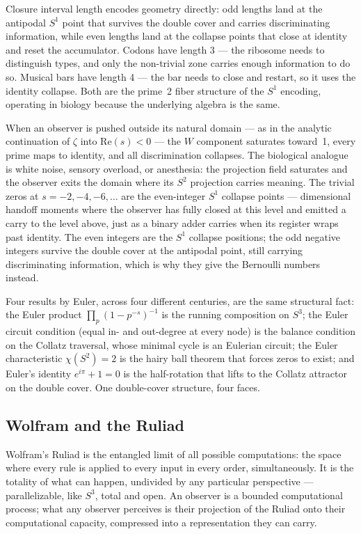 \documentclass[12pt,a4paper]{article}
\theoremstyle{definition}
\theoremstyle{remark}
\begin{document}
Closure interval length encodes geometry directly: odd lengths land at the
antipodal $S^1$ point that survives the double cover and carries discriminating
information, while even lengths land at the collapse points that close at
identity and reset the accumulator. Codons have length 3 --- the ribosome
needs to distinguish types, and only the non-trivial zone carries enough
information to do so. Musical bars have length 4 --- the bar needs to close
and restart, so it uses the identity collapse. Both are the prime~2 fiber
structure of the $S^1$ encoding, operating in biology because the underlying
algebra is the same.

When an observer is pushed outside its natural domain --- as in the analytic
continuation of $\zeta$ into $\mathrm{Re}(s) < 0$ --- the $W$ component
saturates toward~1, every prime maps to identity, and all discrimination
collapses. The biological analogue is white noise, sensory overload, or
anesthesia: the projection field saturates and the observer exits the domain
where its $S^2$ projection carries meaning. The trivial zeros at $s = -2, -4, -6, \ldots$ are the even-integer $S^1$
collapse points --- dimensional handoff moments where the observer has fully
closed at this level and emitted a carry to the level above, just as a binary
adder carries when its register wraps past identity. The even integers are the
$S^1$ collapse positions; the odd negative integers survive the double cover
at the antipodal point, still carrying discriminating information, which is
why they give the Bernoulli numbers instead.

Four results by Euler, across four different centuries, are the same
structural fact: the Euler product $\prod_p (1-p^{-s})^{-1}$ is the running
composition on $S^3$; the Euler circuit condition (equal in- and out-degree at
every node) is the balance condition on the Collatz traversal, whose minimal
cycle is an Eulerian circuit; the Euler characteristic $\chi(S^2) = 2$ is the
hairy ball theorem that forces zeros to exist; and Euler's identity
$e^{i\pi} + 1 = 0$ is the half-rotation that lifts to the Collatz attractor
on the double cover. One double-cover structure, four faces.

\subsection{Wolfram and the Ruliad}

Wolfram's Ruliad is the entangled limit of all possible computations: the
space where every rule is applied to every input in every order,
simultaneously. It is the totality of what can happen, undivided by any particular perspective
--- parallelizable, like $S^3$, total and open. An observer is a bounded
computational process; what any observer perceives is their projection of the
Ruliad onto their computational capacity, compressed into a representation
they can carry.
\end{document}
